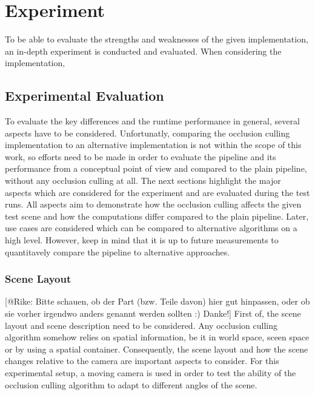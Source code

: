 \chapter{Experiment} \label{cpt-experiment}

To be able to evaluate the strengths and weaknesses of the given implementation, an in-depth 
experiment is conducted and evaluated. When considering the implementation, 


\section{Experimental Evaluation} \label{sec-experimental-evaluation}

To evaluate the key differences and the runtime performance in general, several aspects have to be considered.
Unfortunatly, comparing the occlusion culling implementation to an alternative implementation is not within the 
scope of this work, so efforts need to be made in order to evaluate the pipeline and its performance from a 
conceptual point of view and compared to the plain pipeline, without any occlusion culling at all. The next  
sections highlight the major aspects which are considered for the experiment and are evaluated during the 
test runs. All aspects aim to demonstrate how the occlusion culling affects the given test scene and how the 
computations differ compared to the plain pipeline. Later, use cases are considered which can be compared to 
alternative algorithms on a high level. However, keep in mind that it is up to future measurements to quantitavely
compare the pipeline to alternative approaches. 


\subsection*{Scene Layout}

[@Rike: Bitte schauen, ob der Part (bzw. Teile davon) hier gut hinpassen, oder ob sie vorher irgendwo anders genannt werden sollten :) Danke!]
First of, the scene layout and scene description need to be considered. Any occlusion culling algorithm somehow 
relies on spatial information, be it in world space, sceen space or by using a spatial container. Consequently, 
the scene layout and how the scene changes relative to the camera are important aspects to consider. For this 
experimental setup, a moving camera is used in order to test the ability of the occlusion culling algorithm to 
adapt to different angles of the scene. \\

